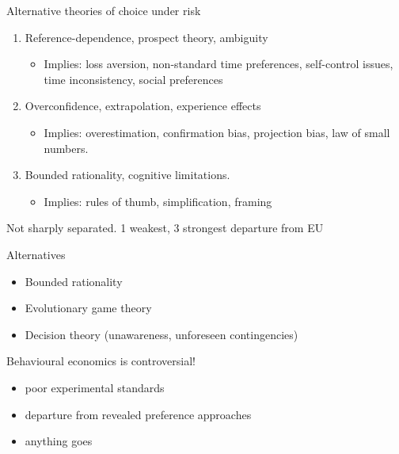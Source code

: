\begin{frame}{Alternative theories of choice under risk}
    \begin{enumerate}
        \item Reference-dependence, prospect theory, ambiguity\medskip
        \begin{itemize}
        \item Implies: loss aversion, non-standard time preferences, self-control issues, time inconsistency, social preferences
        \end{itemize}\medskip
        \item Overconfidence, extrapolation, experience effects\medskip
         \begin{itemize}
        \item Implies: overestimation, confirmation bias, projection bias, law of small numbers.  \end{itemize}\medskip
                \item Bounded rationality, cognitive limitations.\medskip
        \begin{itemize}
        \item Implies: rules of thumb, simplification, framing
        \end{itemize}\medskip
    \end{enumerate}
    Not sharply separated.  1 weakest, 3 strongest departure  from EU
\end{frame}

\begin{frame}{Alternatives}
    \begin{itemize}
        \item Bounded rationality\bigskip
        \item Evolutionary game theory\bigskip
        \item Decision theory (unawareness, unforeseen contingencies)\bigskip
    \end{itemize}\bigskip
\end{frame}
\begin{frame}{Behavioural economics is controversial!}
    \begin{itemize}
        \item poor experimental standards\medskip
        \item departure from revealed preference approaches\medskip
        \item anything goes\medskip
    \end{itemize}
\end{frame}

